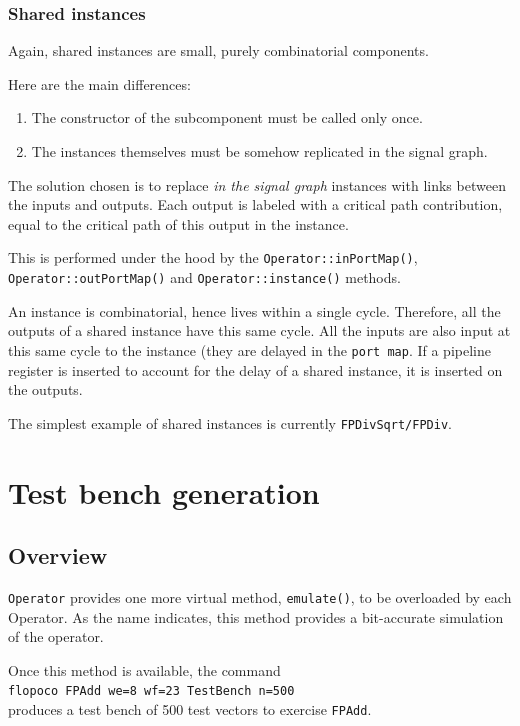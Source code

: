 \documentclass{article}
\begin{document}
\subsubsection{Shared instances}

Again, shared instances are small, purely combinatorial components.

Here are the main differences:
\begin{enumerate}
\item The constructor of the subcomponent must be called only once.
\item The instances themselves must be somehow replicated in the signal graph.
\end{enumerate}
The solution chosen is to replace \emph{in the signal graph} instances with links between the inputs and outputs.
Each output is labeled with a critical path contribution,   equal to the critical path of this output in the instance.

This is performed under the hood by the \verb!Operator::inPortMap()!, \verb!Operator::outPortMap()! and \verb!Operator::instance()! methods.

An instance is combinatorial, hence lives within a single cycle.
Therefore, all the outputs of a shared instance have this same cycle.
All the inputs are also input at this same cycle to the instance (they are delayed in the \texttt{port map}.
If a pipeline register is inserted to account for the delay of a shared instance, it is inserted on the outputs.

The simplest example of shared instances is currently \texttt{FPDivSqrt/FPDiv}.


\section{Test bench generation}\label{sec:test-bench-gener}

\subsection{Overview}
\texttt{\small Operator} provides one more virtual method, \texttt{\small emulate()},
to be overloaded by each Operator. As the name indicates, this method
provides a bit-accurate simulation of the operator.
 
Once this method is available, the command\\
 \texttt{flopoco FPAdd we=8 wf=23 TestBench n=500} \\
produces a test bench of 500 test vectors to exercise \texttt{\small FPAdd}. 
\end{document}
